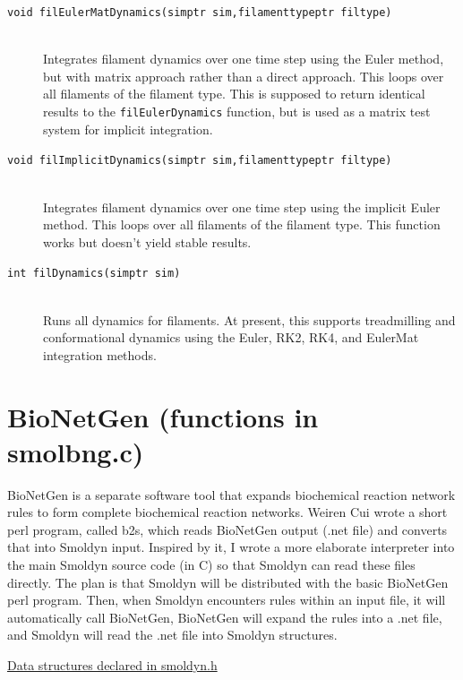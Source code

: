 \documentclass {scrbook}
\newcommand {\ttt} {\texttt}
\begin{document}
\begin{description}
\item[\ttt{void filEulerMatDynamics(simptr sim,filamenttypeptr filtype)}]
\hfill \\
Integrates filament dynamics over one time step using the Euler method, but with matrix approach rather than a direct approach. This loops over all filaments of the filament type. This is supposed to return identical results to the \ttt{filEulerDynamics} function, but is used as a matrix test system for implicit integration.

\item[\ttt{void filImplicitDynamics(simptr sim,filamenttypeptr filtype)}]
\hfill \\
Integrates filament dynamics over one time step using the implicit Euler method. This loops over all filaments of the filament type. This function works but doesn't yield stable results.

\item[\ttt{int filDynamics(simptr sim)}]
\hfill \\
Runs all dynamics for filaments. At present, this supports treadmilling and conformational dynamics using the Euler, RK2, RK4, and EulerMat integration methods.

\end{description}

\section{BioNetGen (functions in smolbng.c)}

BioNetGen is a separate software tool that expands biochemical reaction network rules to form complete biochemical reaction networks. Weiren Cui wrote a short perl program, called b2s, which reads BioNetGen output (.net file) and converts that into Smoldyn input. Inspired by it, I wrote a more elaborate interpreter into the main Smoldyn source code (in C) so that Smoldyn can read these files directly. The plan is that Smoldyn will be distributed with the basic BioNetGen perl program. Then, when Smoldyn encounters rules within an input file, it will automatically call BioNetGen, BioNetGen will expand the rules into a .net file, and Smoldyn will read the .net file into Smoldyn structures.

\underline{Data structures declared in smoldyn.h}
\end{document}
